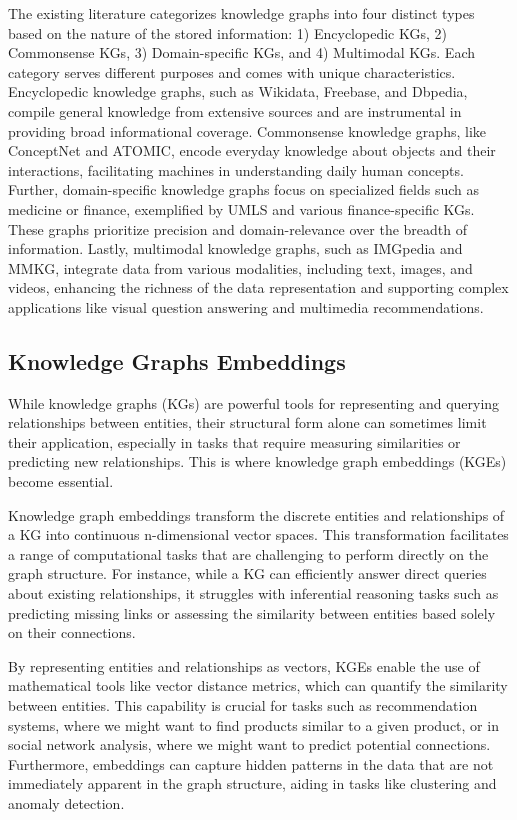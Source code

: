 \documentclass[12pt]{article}
\begin{document}
The existing literature categorizes knowledge graphs into four distinct types based on the nature of the stored information: 1) Encyclopedic KGs, 2) Commonsense KGs, 3) Domain-specific KGs, and 4) Multimodal KGs. Each category serves different purposes and comes with unique characteristics. Encyclopedic knowledge graphs, such as Wikidata, Freebase, and Dbpedia, compile general knowledge from extensive sources and are instrumental in providing broad informational coverage. Commonsense knowledge graphs, like ConceptNet and ATOMIC, encode everyday knowledge about objects and their interactions, facilitating machines in understanding daily human concepts. Further, domain-specific knowledge graphs focus on specialized fields such as medicine or finance, exemplified by UMLS and various finance-specific KGs. These graphs prioritize precision and domain-\hspace{0pt}relevance over the breadth of information. Lastly, multimodal knowledge graphs, such as IMGpedia and MMKG, integrate data from various modalities, including text, images, and videos, enhancing the richness of the data representation and supporting complex applications like visual question answering and multimedia recommendations.

\subsection{Knowledge Graphs Embeddings}

While knowledge graphs (KGs) are powerful tools for representing and querying relationships between entities, their structural form alone can sometimes limit their application, especially in tasks that require measuring similarities or predicting new relationships. This is where knowledge graph embeddings (KGEs) become essential.

Knowledge graph embeddings transform the discrete entities and relationships of a KG into continuous n-dimensional vector spaces. This transformation facilitates a range of computational tasks that are challenging to perform directly on the graph structure. For instance, while a KG can efficiently answer direct queries about existing relationships, it struggles with inferential reasoning tasks such as predicting missing links or assessing the similarity between entities based solely on their connections.

By representing entities and relationships as vectors, KGEs enable the use of mathematical tools like vector distance metrics, which can quantify the similarity between entities. This capability is crucial for tasks such as recommendation systems, where we might want to find products similar to a given product, or in social network analysis, where we might want to predict potential connections. Furthermore, embeddings can capture hidden patterns in the data that are not immediately apparent in the graph structure, aiding in tasks like clustering and anomaly detection.
\end{document}
